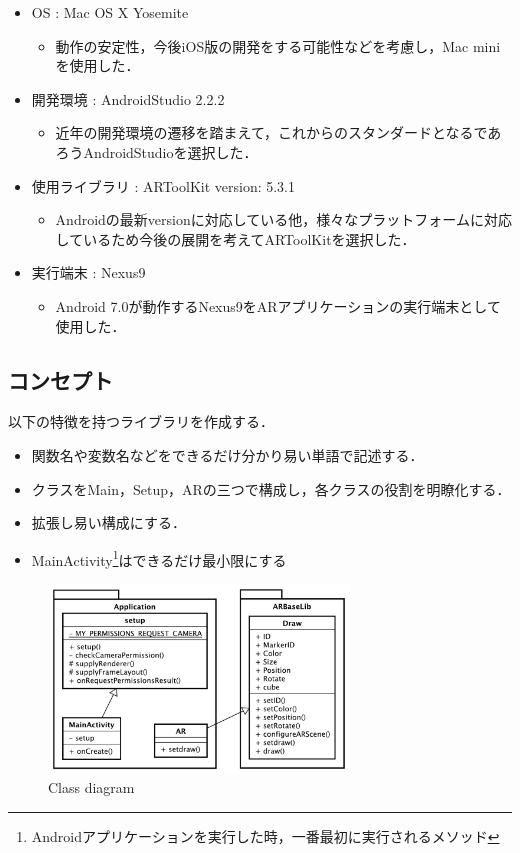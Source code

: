 \documentclass[twocolumn,10pt,a4j]{jsarticle}
\begin{document}
\begin{itemize}
 \item OS : Mac OS X Yosemite
       \begin{itemize}
	\item 動作の安定性，今後iOS版の開発をする可能性などを考慮し，Mac miniを使用した．
       \end{itemize}
 \item 開発環境 : AndroidStudio 2.2.2
       \begin{itemize}
	\item 近年の開発環境の遷移を踏まえて，これからのスタンダードとなるであろうAndroidStudioを選択した．
       \end{itemize}
 \item 使用ライブラリ : ARToolKit version: 5.3.1
       \begin{itemize}
	\item Androidの最新versionに対応している他，様々なプラットフォームに対応しているため今後の展開を考えてARToolKitを選択した．
       \end{itemize}
 \item 実行端末 : Nexus9
       \begin{itemize}
	\item Android 7.0が動作するNexus9をARアプリケーションの実行端末として使用した．
       \end{itemize}
\end{itemize}

\subsection{コンセプト}
以下の特徴を持つライブラリを作成する．
\begin{itemize}
 \item 関数名や変数名などをできるだけ分かり易い単語で記述する．
 \item クラスをMain，Setup，ARの三つで構成し，各クラスの役割を明瞭化する．
 \item 拡張し易い構成にする．
 \item MainActivity\footnote{Androidアプリケーションを実行した時，一番最初に実行されるメソッド}はできるだけ最小限にする
\end{itemize}

\begin{figure}[tb]
 \centering
 \includegraphics[width=8cm]{fig/class.pdf}
 \caption{Class diagram}
 \label{fig:class}
\end{figure}
\end{document}
